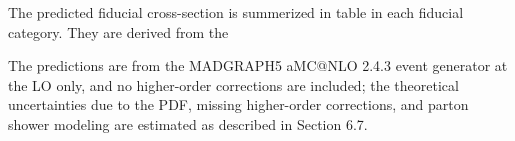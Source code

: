 The predicted fiducial cross-section is summerized in table in each fiducial category.
They are derived from the 

The predictions are from the MADGRAPH5 aMC@NLO 2.4.3 event generator at the LO only, and no higher-order corrections are included; 
the theoretical uncertainties due to the PDF, missing higher-order corrections, and parton shower modeling are estimated as described in Section 6.7. 


